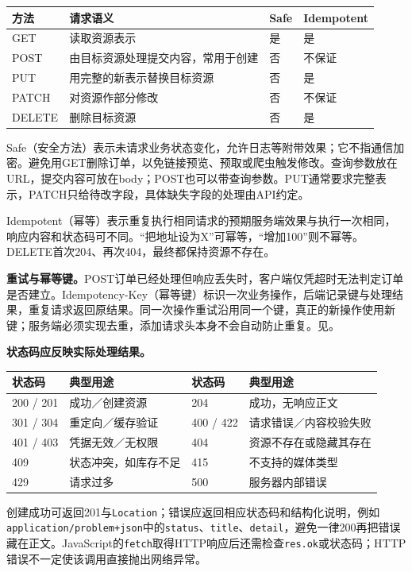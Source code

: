 \begin{center}
\small
\begin{tabularx}{\textwidth}{@{}p{1.5cm}Xp{1.4cm}p{2cm}@{}}
\toprule
方法 & 请求语义 & Safe & Idempotent \\
\midrule
GET & 读取资源表示 & 是 & 是 \\
POST & 由目标资源处理提交内容，常用于创建 & 否 & 不保证 \\
PUT & 用完整的新表示替换目标资源 & 否 & 是 \\
PATCH & 对资源作部分修改 & 否 & 不保证 \\
DELETE & 删除目标资源 & 否 & 是 \\
\bottomrule
\end{tabularx}
\end{center}

Safe（安全方法）表示未请求业务状态变化，允许日志等附带效果；它不指通信加密。避免用GET删除订单，以免链接预览、预取或爬虫触发修改。查询参数放在URL，提交内容可放在body；POST也可以带查询参数。PUT通常要求完整表示，PATCH只给待改字段，具体缺失字段的处理由API约定。

Idempotent（幂等）表示重复执行相同请求的预期服务端效果与执行一次相同，响应内容和状态码可不同。“把地址设为X”可幂等，“增加100”则不幂等。DELETE首次204、再次404，最终都保持资源不存在。

\textbf{重试与幂等键。}POST订单已经处理但响应丢失时，客户端仅凭超时无法判定订单是否建立。Idempotency-Key（幂等键）标识一次业务操作，后端记录键与处理结果，重复请求返回原结果。同一次操作重试沿用同一个键，真正的新操作使用新键；服务端必须实现去重，添加请求头本身不会自动防止重复。见。

\textbf{状态码应反映实际处理结果。}
\begin{center}
\small
\begin{tabularx}{\textwidth}{@{}p{2.7cm}Xp{2.7cm}X@{}}
\toprule
状态码 & 典型用途 & 状态码 & 典型用途 \\
\midrule
200 / 201 & 成功／创建资源 & 204 & 成功，无响应正文 \\
301 / 304 & 重定向／缓存验证 & 400 / 422 & 请求错误／内容校验失败 \\
401 / 403 & 凭据无效／无权限 & 404 & 资源不存在或隐藏其存在 \\
409 & 状态冲突，如库存不足 & 415 & 不支持的媒体类型 \\
429 & 请求过多 & 500 & 服务器内部错误 \\
\bottomrule
\end{tabularx}
\end{center}
创建成功可返回201与\texttt{Location}；错误应返回相应状态码和结构化说明，例如\nolinkurl{application/problem+json}中的\texttt{status}、\texttt{title}、\texttt{detail}，避免一律200再把错误藏在正文。JavaScript的\texttt{fetch}取得HTTP响应后还需检查\texttt{res.ok}或状态码；HTTP错误不一定使该调用直接抛出网络异常。

